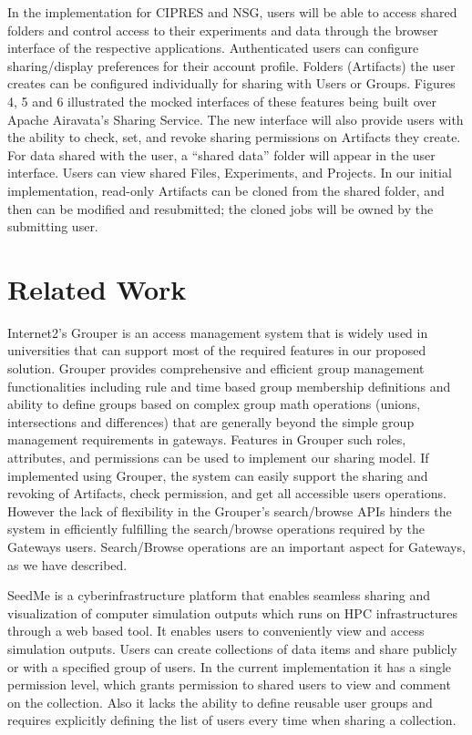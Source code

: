 \documentclass[sigconf]{acmart}
\begin{document}
In the implementation for CIPRES and NSG, users will be able to access shared folders and control access to their experiments and data through the browser interface of the respective applications. Authenticated users can configure sharing/display preferences for their account profile. Folders (Artifacts) the user creates can be configured individually for sharing with Users or Groups. Figures 4, 5 and 6 illustrated the mocked interfaces of these features being built over Apache Airavata's Sharing Service. The new interface will also provide users with the ability to check, set, and revoke sharing permissions on Artifacts they create. For data shared with the user, a ``shared data'' folder will appear in the user interface. Users can view shared Files, Experiments, and Projects. In our initial implementation, read-only Artifacts can be cloned from the shared folder, and then can be modified and resubmitted; the cloned jobs will be owned by the submitting user.

\section{Related Work}

Internet2's Grouper \cite{grouperWebsite} is an access management system that is widely used in universities that can support most of the required features in our proposed solution. Grouper provides comprehensive and efficient group management functionalities including rule and time based group membership definitions and ability to define groups based on complex group math operations (unions, intersections and differences) that are generally beyond the simple group management requirements in gateways. Features in Grouper such roles, attributes, and permissions can be used to implement our sharing model. If implemented using Grouper, the system can easily support the sharing and revoking of Artifacts, check permission, and get all accessible users operations. However the lack of flexibility in the Grouper's search/browse APIs hinders the system in efficiently fulfilling the search/browse operations required by the Gateways users. Search/Browse operations are an important aspect for Gateways, as we have described.

SeedMe \cite{chourasia2013seedme} is a cyberinfrastructure platform that enables seamless sharing and visualization of computer simulation outputs which runs on HPC infrastructures through a web based tool. It enables users to conveniently view and access simulation outputs. Users can create collections of data items and share publicly or with a specified group of users. In the current implementation it has a single permission level, which grants permission to shared users to view and comment on the collection. Also it lacks the ability to define reusable user groups and requires explicitly defining the list of users every time when sharing a collection.
\end{document}
